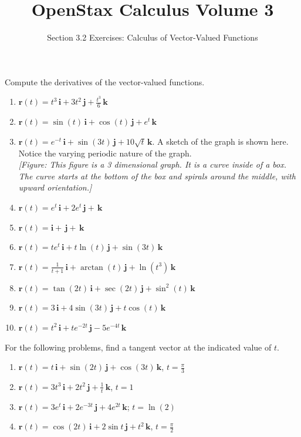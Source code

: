 \documentclass{exercises}
\title{OpenStax Calculus Volume 3}
\subtitle{Section 3.2 Exercises: Calculus of Vector-Valued Functions}
\author{}
\date{}
\begin{document}
\maketitle


Compute the derivatives of the vector-valued functions.

\begin{enumerate}[start=1]
\item $\mathbf{r}(t)=t^{3}\,\mathbf{i}+3t^{2}\,\mathbf{j}+\frac{t^{3}}{6}\,\mathbf{k}$
\item $\mathbf{r}(t)=\sin(t)\,\mathbf{i}+\cos(t)\,\mathbf{j}+e^{t}\,\mathbf{k}$
\item $\mathbf{r}(t)=e^{-t}\,\mathbf{i}+\sin(3t)\,\mathbf{j}+10\sqrt{t}\,\mathbf{k}$. A sketch of the graph is shown here. Notice the varying periodic nature of the graph. \\ \textit{[Figure: This figure is a 3 dimensional graph. It is a curve inside of a box. The curve starts at the bottom of the box and spirals around the middle, with upward orientation.]}
\item $\mathbf{r}(t)=e^{t}\,\mathbf{i}+2e^{t}\,\mathbf{j}+\,\mathbf{k}$
\item $\mathbf{r}(t)=\mathbf{i}+\,\mathbf{j}+\,\mathbf{k}$
\item $\mathbf{r}(t)=te^{t}\,\mathbf{i}+t\ln(t)\,\mathbf{j}+\sin(3t)\,\mathbf{k}$
\item $\mathbf{r}(t)=\frac{1}{t+1}\,\mathbf{i}+\arctan(t)\,\mathbf{j}+\ln(t^{3})\,\mathbf{k}$
\item $\mathbf{r}(t)=\tan(2t)\,\mathbf{i}+\sec(2t)\,\mathbf{j}+\sin^{2}(t)\,\mathbf{k}$
\item $\mathbf{r}(t)=3\,\mathbf{i}+4\sin(3t)\,\mathbf{j}+t\cos(t)\,\mathbf{k}$
\item $\mathbf{r}(t)=t^{2}\,\mathbf{i}+te^{-2t}\,\mathbf{j}-5e^{-4t}\,\mathbf{k}$
\end{enumerate}

For the following problems, find a tangent vector at the indicated value of $t$.

\begin{enumerate}[resume]
\item $\mathbf{r}(t)=t\,\mathbf{i}+\sin(2t)\,\mathbf{j}+\cos(3t)\,\mathbf{k}$, $t=\frac{\pi}{3}$
\item $\mathbf{r}(t)=3t^{3}\,\mathbf{i}+2t^{2}\,\mathbf{j}+\frac{1}{t}\,\mathbf{k}$, $t=1$
\item $\mathbf{r}(t)=3e^{t}\,\mathbf{i}+2e^{-3t}\,\mathbf{j}+4e^{2t}\,\mathbf{k}$; $t=\ln(2)$
\item $\mathbf{r}(t)=\cos(2t)\,\mathbf{i}+2\sin t\,\mathbf{j}+t^{2}\,\mathbf{k}$, $t=\frac{\pi}{2}$
\end{enumerate}
\end{document}
